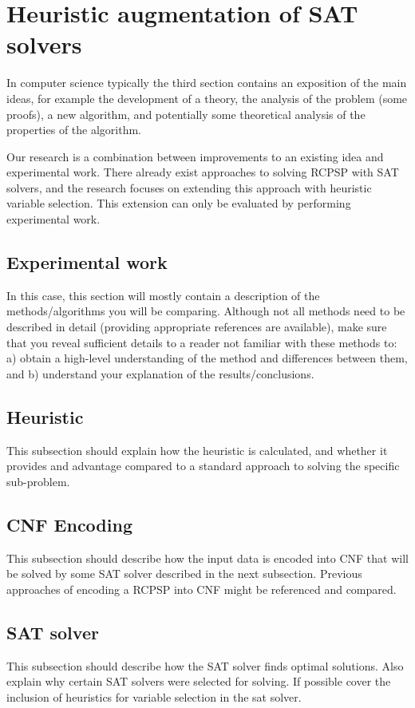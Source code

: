 \section{Heuristic augmentation of SAT solvers}
In computer science typically the third section contains an exposition of the main ideas, for example the development of a theory, the analysis of the problem (some proofs), a new algorithm, and potentially some theoretical analysis of the properties of the algorithm.

Our research is a combination between improvements to an existing idea and experimental work. There already exist approaches to solving RCPSP with SAT solvers, and the research focuses on extending this approach with heuristic variable selection. This extension can only be evaluated by performing experimental work. %


\subsection*{Experimental work}
In this case, this section will mostly contain a description of the methods/algorithms you will be comparing. Although not all methods need to be described in detail (providing appropriate references are available), make sure that you reveal sufficient details to a reader not familiar with these methods to: a) obtain a high-level understanding of the method and differences between them, and b) understand your explanation of the results/conclusions.

\subsection*{Heuristic}
This subsection should explain how the heuristic is calculated, and whether it provides and advantage compared to a standard approach to solving the specific sub-problem.

\subsection*{CNF Encoding}
This subsection should describe how the input data is encoded into CNF that will be solved by some SAT solver described in the next subsection. 
Previous approaches of encoding a RCPSP into CNF might be referenced and compared.

\subsection*{SAT solver}
This subsection should describe how the SAT solver finds optimal solutions.
Also explain why certain SAT solvers were selected for solving.
If possible cover the inclusion of heuristics for variable selection in the sat solver.